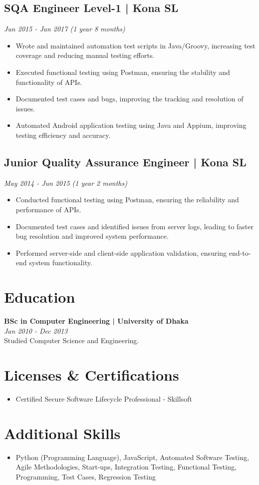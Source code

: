 \documentclass[a4paper,9pt]{article}
\begin{document}
\subsection*{SQA Engineer Level-1 | Kona SL}
\textit{Jun 2015 - Jan 2017 (1 year 8 months)}
\begin{itemize}
    \item Wrote and maintained automation test scripts in Java/Groovy, increasing test coverage and reducing manual testing efforts.
    \item Executed functional testing using Postman, ensuring the stability and functionality of APIs.
    \item Documented test cases and bugs, improving the tracking and resolution of issues.
    \item Automated Android application testing using Java and Appium, improving testing efficiency and accuracy.
\end{itemize}

\subsection*{Junior Quality Assurance Engineer | Kona SL}
\textit{May 2014 - Jun 2015 (1 year 2 months)}
\begin{itemize}
    \item Conducted functional testing using Postman, ensuring the reliability and performance of APIs.
    \item Documented test cases and identified issues from server logs, leading to faster bug resolution and improved system performance.
    \item Performed server-side and client-side application validation, ensuring end-to-end system functionality.
\end{itemize}

\section*{Education}
\textbf{BSc in Computer Engineering | University of Dhaka} \\
\textit{Jan 2010 - Dec 2013} \\
Studied Computer Science and Engineering.

\section*{Licenses \& Certifications}
\begin{itemize}
    \item Certified Secure Software Lifecycle Professional - Skillsoft
\end{itemize}

\section*{Additional Skills}
\begin{itemize}
    \item Python (Programming Language), JavaScript, Automated Software Testing, Agile Methodologies, Start-ups, Integration Testing, Functional Testing, Programming, Test Cases, Regression Testing
\end{itemize}
\end{document}
